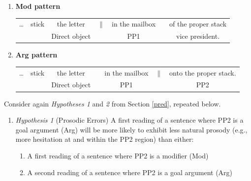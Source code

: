 \documentclass[11pt,oneside]{book}
\providecommand{\tightlist}{%
  \setlength{\itemsep}{0pt}\setlength{\parskip}{0pt}}
\begin{document}
\singlespacing

\begin{enumerate}
\def\labelenumi{(\arabic{enumi})}
\setcounter{enumi}{39}
\tightlist
\item
  \textbf{Mod pattern}
  \begingroup
  \setlength{\tabcolsep}{2pt}

  \begin{tabular}{ccccccc}
    \dots & stick & the letter & $\|$ & in the mailbox &  & of the proper stack \\
    & & \footnotesize Direct object & & \footnotesize PP1 & & \footnotesize vice president. \\
  \end{tabular}
    \endgroup
\item
  \textbf{Arg pattern}
  \begingroup
  \setlength{\tabcolsep}{2pt}

  \begin{tabular}{ccccccc}
    \dots & stick & the letter & & in the mailbox & $\|$ & onto the proper stack. \\
    & & \footnotesize Direct object & & \footnotesize PP1 & & \footnotesize PP2 \\
  \end{tabular}
    \endgroup
\end{enumerate}

\doublespacing

Consider again \emph{Hypotheses 1} and \emph{2} from Section \ref{pred}, repeated below.

\begin{enumerate}
\def\labelenumi{(\arabic{enumi})}
\setcounter{enumi}{41}
\tightlist
\item
  \emph{Hypothesis 1} (Prosodic Errors)\linebreak\nopagebreak
  A first reading of a sentence where PP2 is a goal argument (Arg) will be more likely to exhibit less natural prosody (e.g., more hesitation at and within the PP2 region) than either:

  \begin{enumerate}
  \def\labelenumii{\alph{enumii}.}
  \tightlist
  \item
    A first reading of a sentence where PP2 is a modifier (Mod)
  \item
    A second reading of a sentence where PP2 is a goal argument (Arg)
  \end{enumerate}
\end{enumerate}
\end{document}
